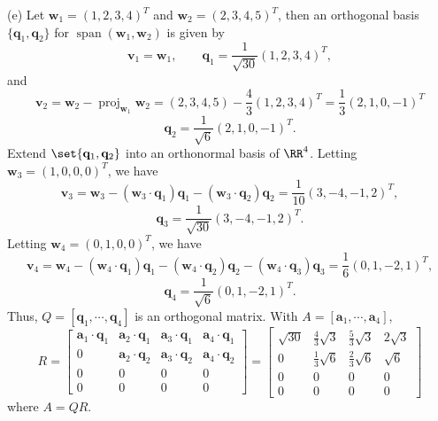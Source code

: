 \documentclass{homework}
\begin{document}
{\noindent(e) Let $\mathbf w_1 = (1,2,3,4)^T$ and $\mathbf w_2 = (2,3,4,5)^T$, then an orthogonal basis $\{\mathbf q_1,\mathbf q_2\}$ for $\operatorname{span}(\mathbf w_1,\mathbf w_2)$ is given by
$$ \mathbf v_1 = \mathbf w_1,\qquad \mathbf q_1 = \frac 1{\sqrt{30}}(1,2,3,4)^T, $$
and
$$ \mathbf v_2 = \mathbf w_2 - \operatorname{proj}_{\mathbf w_1}\mathbf w_2 = (2,3,4,5) - \frac{4}{3}(1,2,3,4)^T = \frac 1 3(2,1,0,-1)^T $$
$$ \mathbf q_2 = \frac 1{\sqrt{6}}(2,1,0,-1)^T. $$
Extend $\set{\mathbf q_1,\mathbf q_2}$ into an orthonormal basis of $\RR^4$. Letting $\mathbf w_3 = (1,0,0,0)^T$, we have
$$ \mathbf v_3 = \mathbf w_3 - (\mathbf w_3 \cdot \mathbf q_1)\mathbf q_1 - (\mathbf w_3 \cdot \mathbf q_2)\mathbf q_2 = \frac 1 {10}(3,-4,-1,2)^T, $$
$$ \mathbf q_3 = \frac 1 {\sqrt{30}}(3,-4,-1,2)^T. $$
Letting $\mathbf w_4 = (0,1,0,0)^T$, we have
$$ \mathbf v_4 = \mathbf w_4 - (\mathbf w_4 \cdot \mathbf q_1)\mathbf q_1 - (\mathbf w_4 \cdot \mathbf q_2)\mathbf q_2 - (\mathbf w_4 \cdot \mathbf q_3)\mathbf q_3 = \frac 1 {6}(0,1,-2,1)^T, $$
$$ \mathbf q_4 = \frac 1 {\sqrt{6}}(0,1,-2,1)^T. $$
Thus, $Q = [\mathbf q_1,\cdots,\mathbf q_4]$ is an orthogonal matrix. With $A = [\mathbf a_1,\cdots,\mathbf a_4]$,
$$ R = \begin{bmatrix}
        \mathbf a_1\cdot \mathbf q_1 & \mathbf a_2\cdot \mathbf q_1 & \mathbf a_3\cdot\mathbf q_1 & \mathbf a_4\cdot \mathbf q_1 \\
        0                            & \mathbf a_2\cdot \mathbf q_2 & \mathbf a_3\cdot\mathbf q_2 & \mathbf a_4\cdot \mathbf q_2 \\
        0                            & 0                            & 0                           & 0                            \\
        0                            & 0                            & 0                           & 0
    \end{bmatrix} = \begin{bmatrix}
        \sqrt{30} & \frac 43\sqrt{3} & \frac 53\sqrt{3} & 2\sqrt3 \\
        0         & \frac13 \sqrt 6  & \frac23 \sqrt 6  & \sqrt 6 \\
        0         & 0                & 0                & 0       \\
        0         & 0                & 0                & 0
    \end{bmatrix} $$
where $A=QR$.

}
\end{document}

